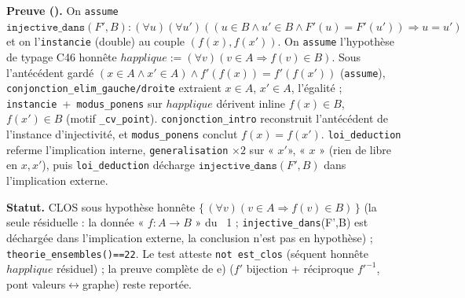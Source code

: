 \textbf{Preuve (\Nstar).} On \texttt{assume} $\texttt{injective\_dans}(F',B) : (\forall u)(\forall u')((u\in B \wedge u'\in B \wedge F'(u)=F'(u')) \Rightarrow u=u')$ et on l'\texttt{instancie} (double) au couple $(f(x), f(x'))$. On \texttt{assume} l'hypothèse de typage C46 honnête $happlique := (\forall v)(v\in A \Rightarrow f(v)\in B)$. Sous l'antécédent gardé $(x\in A \wedge x'\in A) \wedge f'(f(x))=f'(f(x'))$ (\texttt{assume}), \texttt{conjonction\_elim\_gauche/droite} extraient $x\in A$, $x'\in A$, l'égalité ; \texttt{instancie}~+~\texttt{modus\_ponens} sur $happlique$ dérivent inline $f(x)\in B$, $f(x')\in B$ (motif \texttt{\_cv\_point}). \texttt{conjonction\_intro} reconstruit l'antécédent de l'instance d'injectivité, et \texttt{modus\_ponens} conclut $f(x)=f(x')$. \texttt{loi\_deduction} referme l'implication interne, \texttt{generalisation} $\times 2$ sur « $x' $», « $x$ » (rien de libre en $x, x'$), puis \texttt{loi\_deduction} décharge $\texttt{injective\_dans}(F',B)$ dans l'implication externe.

\textbf{Statut.} CLOS sous hypothèse honnête $\{\,(\forall v)(v\in A \Rightarrow f(v)\in B)\,\}$ (la seule résiduelle : la donnée « $f : A \to B$ » du \theoreme~1 ; \texttt{injective\_dans}(F',B) est déchargée dans l'implication externe, la conclusion n'est pas en hypothèse) ; \texttt{theorie\_ensembles()==22}. Le test atteste \texttt{not est\_clos} (séquent honnête $happlique$ résiduel) ; la preuve complète de e) ($f'$ bijection $+$ réciproque $f'^{-1}$, pont valeurs$\leftrightarrow$graphe) reste reportée.
